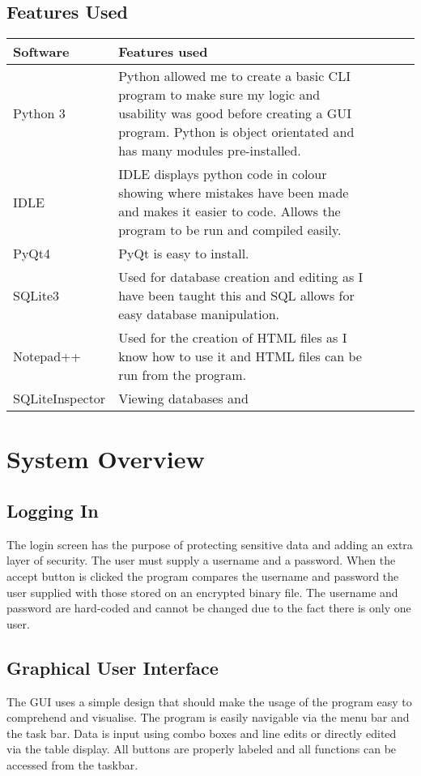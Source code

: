 \subsection{Features Used}
\begin{center}
	\begin{tabular}{|p{2cm}|p{2cm}|p{2cm}|p{2cm}|l}
		\hline
		\textbf{Software}   & \textbf{Features used} \\ \hline
		Python 3 & Python allowed me to create a basic CLI program to make sure my logic and usability was good before creating a GUI program. Python is object orientated and has many modules pre-installed.\\ \hline
		IDLE &  IDLE displays python code in colour showing where mistakes have been made and makes it easier to code. Allows the program to be run and compiled easily. \\ \hline
		PyQt4 & PyQt is easy to install. \\ \hline
		SQLite3 & Used for database creation and editing as I have been taught this and SQL allows for easy database manipulation. \\ \hline
		Notepad++ & Used for the creation of HTML files as I know how to use it and HTML files can be run from the program. \\ \hline
		SQLiteInspector & Viewing databases and \\ \hline
	\end{tabular}
\end{center}


\section{System Overview}

\subsection{Logging In}
The login screen has the purpose of protecting sensitive data and adding an extra layer of security. The user must supply a username and a password. When the accept button is clicked the program compares the username and password the user supplied with those stored on an encrypted binary file. The username and password are hard-coded and cannot be changed due to the fact there is only one user.

\subsection{Graphical User Interface}
The GUI uses a simple design that should make the usage of the program easy to comprehend and visualise. The program is easily navigable via the menu bar and the task bar. Data is input using combo boxes and line edits or directly edited via the table display. All buttons are properly labeled and all functions can be accessed from the taskbar.

